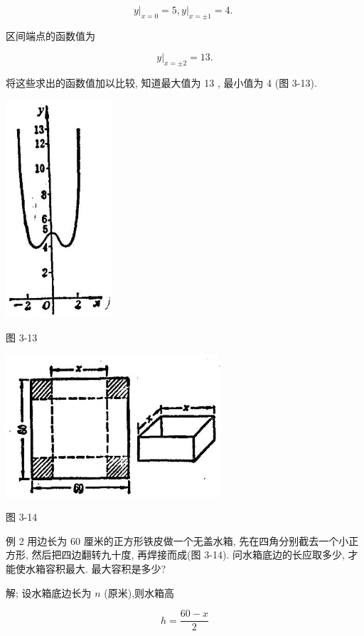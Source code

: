 \documentclass[10pt]{article}
\begin{document}
\[
{\left. y\right| }_{x = 0} = 5,{\left. y\right| }_{x = \pm 1} = 4\text{. }
\]

区间端点的函数值为

\[
{\left. y\right| }_{x = \pm 2} = {13}\text{.}
\]

将这些求出的函数值加以比较, 知道最大值为 13 , 最小值为 4 (图 3-13).

\begin{center}
\includegraphics[max width=0.3\textwidth]{images/01912c18-5c3f-733d-b775-749ba9897a9d_148_436471.jpg}
\end{center}

图 3-13

\begin{center}
\includegraphics[max width=0.6\textwidth]{images/01912c18-5c3f-733d-b775-749ba9897a9d_148_813570.jpg}
\end{center}

图 3-14

例 2 用边长为 60 厘米的正方形铁皮做一个无盖水箱, 先在四角分别截去一个小正方形, 然后把四边翻转九十度, 再焊接而成(图 3-14). 问水箱底边的长应取多少, 才能使水箱容积最大. 最大容积是多少?

解; 设水箱底边长为 \(n\) (原米),则水箱高

\[
h = \frac{{60} - x}{2}
\]
\end{document}
